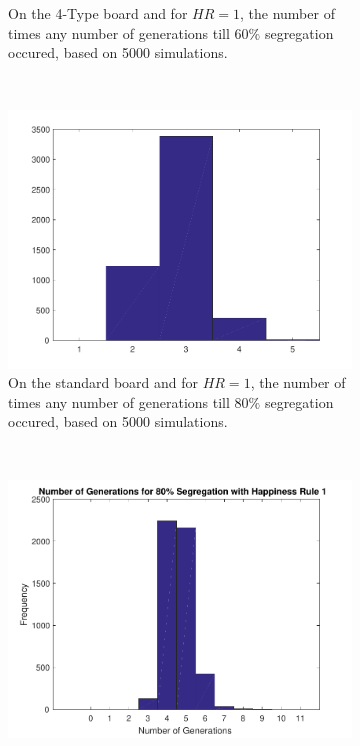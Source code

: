 \begin{figure}[H]
\begin{subfigure}{0.45\textwidth}
    \caption{On the 4-Type board and for $HR=1$, the number of times any number of generations till $60\%$ segregation occured, based on 5000 simulations.}
    \label{fig:segaantgen_460}
\end{subfigure}
~
\begin{subfigure}{0.45\textwidth}
    \centering
    \includegraphics[width=\textwidth]{./60_80_segregation_aantgen/80_segregation.pdf}
    \caption{On the standard board and for $HR=1$, the number of times any number of generations till $80\%$ segregation occured, based on 5000 simulations.}
    \label{fig:segaantgen_s80}
\end{subfigure}
~
\begin{subfigure}{0.45\textwidth}
    \centering
    \includegraphics[width=\textwidth]{./60_80_segregation_aantgen/4TypeBoard/80_segregation.pdf}

\end{subfigure}
\end{figure}
